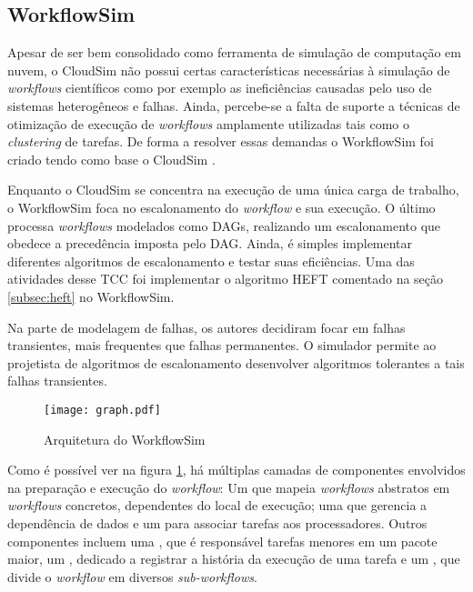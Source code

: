 \subsection{WorkflowSim}
\label{subsec:workflowsim}
Apesar de ser bem consolidado como ferramenta de simulação de computação em nuvem,
o CloudSim não possui certas características necessárias à simulação de 
\emph{workflows} científicos como por exemplo as ineficiências causadas pelo
uso de sistemas heterogêneos e falhas. Ainda, percebe-se a falta de suporte a 
técnicas de otimização de execução de \emph{workflows} amplamente utilizadas
tais como o \emph{clustering} de tarefas. De forma a resolver essas demandas
o WorkflowSim foi criado tendo como base o CloudSim \cite{chen:workflowsim}.

Enquanto o CloudSim se concentra na execução de uma única carga de trabalho,
o WorkflowSim foca no escalonamento do \emph{workflow} e sua execução. O último
processa \emph{workflows} modelados como DAGs, realizando um escalonamento que 
obedece a precedência imposta pelo DAG. Ainda, é simples implementar diferentes
algoritmos de escalonamento e testar suas eficiências. Uma das atividades desse
TCC foi implementar o algoritmo HEFT comentado na seção \ref{subsec:heft} no 
WorkflowSim.

Na parte de modelagem de falhas, os autores decidiram focar em falhas transientes,
mais frequentes que falhas permanentes. O simulador permite ao projetista de
algoritmos de escalonamento desenvolver algoritmos tolerantes a tais falhas 
transientes.

\begin{figure}
\centering
\texttt{[image: graph.pdf]}
\caption{Arquitetura do WorkflowSim}
\label{fig:arquitetura_workflowsim}
\end{figure}

Como é possível ver na figura \ref{fig:arquitetura_workflowsim}, há múltiplas 
camadas de componentes envolvidos na preparação e execução do \emph{workflow}:
Um  que mapeia \emph{workflows} abstratos em
\emph{workflows} concretos, dependentes do local de execução; uma  que gerencia a dependência de dados e um  para 
associar tarefas aos processadores. Outros componentes incluem uma , que é responsável tarefas menores em um pacote maior, um , dedicado a registrar a história da execução de uma tarefa e um 
, que divide o \emph{workflow} em diversos
\emph{sub-workflows}. 


